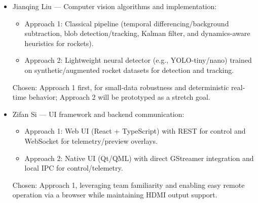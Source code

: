 \documentclass[12pt]{article}
\begin{document}
\begin{enumerate}
\begin{itemize}
          \item Jianqing Liu — Computer vision algorithms and implementation:
                \begin{itemize}
                  \item Approach 1: Classical pipeline (temporal differencing/background subtraction,
                        blob detection/tracking, Kalman filter, and dynamics-aware heuristics for
                        rockets).
                  \item Approach 2: Lightweight neural detector (e.g., YOLO-tiny/nano) trained on
                        synthetic/augmented rocket datasets for detection and tracking.
                \end{itemize}
                Chosen: Approach 1 first, for small-data robustness and deterministic real-time behavior; Approach 2 will be prototyped as a stretch goal.

          \item Zifan Si — UI framework and backend communication:
                \begin{itemize}
                  \item Approach 1: Web UI (React + TypeScript) with REST for control and WebSocket for
                        telemetry/preview overlays.
                  \item Approach 2: Native UI (Qt/QML) with direct GStreamer integration and local IPC
                        for control/telemetry.
                \end{itemize}
                Chosen: Approach 1, leveraging team familiarity and enabling easy remote operation via a browser while maintaining HDMI output support.
        \end{itemize}
\end{enumerate}
\end{document}
